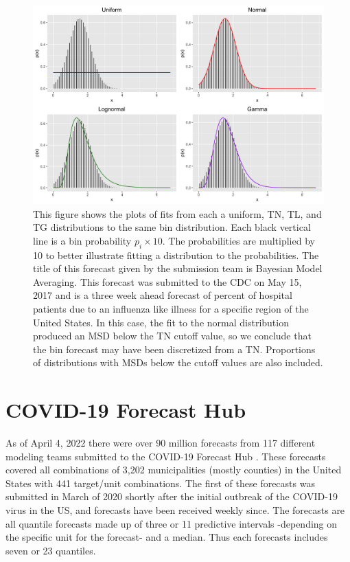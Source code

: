 \documentclass[11pt,notitlepage]{isuthesis}
\begin{document}
\begin{figure}[htbp]
\centerline{\includegraphics[scale=.15]{Images/flu_fit_17_10_3.png}}
\begin{center}
\begin{minipage}{10cm}
\captionsetup{font=scriptsize}
\caption[Parametric distribution fits to binned distribution]{This figure shows
the plots of fits from each a uniform, TN, TL,
and TG distributions to the same bin distribution. Each black vertical line is
a bin probability $p_i \times 10$. The probabilities are multiplied by 10 to 
better illustrate fitting a distribution to the probabilities.
The title of this forecast
given by the submission team is Bayesian Model Averaging. This forecast was
submitted to the CDC on May 15, 2017 and is a three week ahead forecast of
percent of hospital patients due to an influenza like illness for a specific
region of the United States.
In this case, the fit to the normal distribution produced an MSD below the 
TN cutoff value, so we conclude that the bin forecast may have been
discretized from a TN. Proportions of distributions with MSDs 
below the cutoff values are also included.}
\label{fig:binparamfits}
\end{minipage}
\end{center}
\end{figure}



\section{COVID-19 Forecast Hub}
\label{section:covdretro}

As of April 4, 2022 there were over 90 million forecasts  
from 117 different modeling teams submitted to the COVID-19 Forecast Hub 
\cite[]{zoltarcovid}. 
These 
forecasts covered all combinations of 3,202 municipalities (mostly counties) 
in the United States with 441 target/unit combinations. 
The first of these forecasts was 
submitted in March of 2020 shortly after the initial outbreak of the COVID-19 
virus in 
the US, and forecasts have been received weekly since. 
The forecasts are all quantile forecasts made up of three or 11 predictive 
intervals -depending on the specific unit for the forecast-
and a median. Thus each forecasts includes seven or 23 quantiles.
\end{document}
